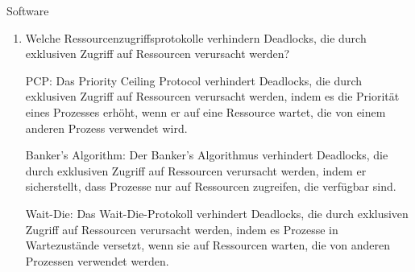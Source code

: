 \documentclass{article}
\begin{document}
\begin{exercise}{Software}
\begin{enumerate}
    \item Welche Ressourcenzugriffsprotokolle verhindern Deadlocks, die durch exklusiven Zugriff auf Ressourcen verursacht werden?

          \begin{solution}
            PCP: Das Priority Ceiling Protocol verhindert Deadlocks, die durch exklusiven Zugriff auf Ressourcen verursacht werden, indem es die Priorität eines Prozesses erhöht, wenn er auf eine Ressource wartet, die von einem anderen Prozess verwendet wird.

            Banker's Algorithm: Der Banker's Algorithmus verhindert Deadlocks, die durch exklusiven Zugriff auf Ressourcen verursacht werden, indem er sicherstellt, dass Prozesse nur auf Ressourcen zugreifen, die verfügbar sind.

            Wait-Die: Das Wait-Die-Protokoll verhindert Deadlocks, die durch exklusiven Zugriff auf Ressourcen verursacht werden, indem es Prozesse in Wartezustände versetzt, wenn sie auf Ressourcen warten, die von anderen Prozessen verwendet werden.
          \end{solution}
  \end{enumerate}
\end{exercise}
\end{document}
